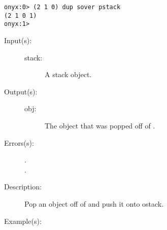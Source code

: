 \begin{description}
\begin{description}
\begin{verbatim}
onyx:0> (2 1 0) dup sover pstack
(2 1 0 1)
onyx:1>
		\end{verbatim}
	\end{description}
\label{systemdict:spop}
\item[{\onyxop{stack}{spop}{obj}}: ]
	\begin{description}\item[]
	\item[Input(s): ]
		\begin{description}\item[]
		\item[stack: ]
			A stack object.
		\end{description}
	\item[Output(s): ]
		\begin{description}\item[]
		\item[obj: ]
			The object that was popped off of .
		\end{description}
	\item[Errors(s): ]
		\begin{description}\item[]
		\item[.]
		\item[.]
		\end{description}
	\item[Description: ]
		Pop an object off of  and push it onto ostack.
	\item[Example(s): ]\begin{verbatim}


\end{verbatim}
\end{description}
\end{description}
